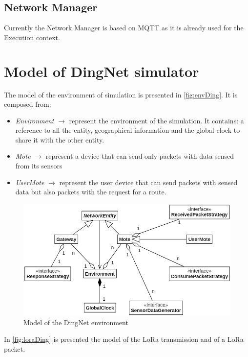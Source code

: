 \subsection{Network Manager}
Currently the Network Manager is based on MQTT as it is already used for the Execution context.

\section{Model of DingNet simulator}

The model of the environment of simulation is presented in \autoref{fig:envDing}. It is composed from:
\begin{itemize}
    \item \textit{Environment} $\rightarrow$ represent the environment of the simulation. It contains: a reference to all the entity, geographical information and the global clock to share it with the other entity.
    \item \textit{Mote} $\rightarrow$ represent a device that can send only packets with data sensed from its sensors
    \item \textit{UserMote} $\rightarrow$ represent the user device that can send packets with sensed data but also packets with the request for a route.
\end{itemize}
\begin{figure}[h]
    \centering
    \includegraphics[scale=0.9]{images/envDing.png}
    \caption{Model of the DingNet environment}
    \label{fig:envDing}
\end{figure}
\clearpage
In \autoref{fig:loraDing} is presented the model of the LoRa transmission and of a LoRa packet.

